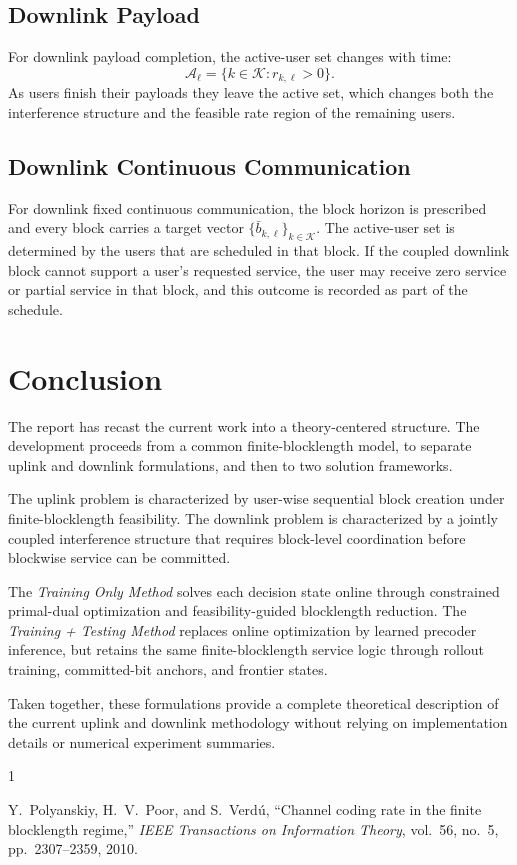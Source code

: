 \documentclass[11pt]{article}
\newcommand{\Kset}{\mathcal{K}}
\newcommand{\Aset}{\mathcal{A}}
\begin{document}
\subsection{Downlink Payload}

For downlink payload completion, the active-user set changes with time:
\begin{equation}
\Aset_\ell = \{k\in\Kset : r_{k,\ell}>0\}.
\label{eq:downlink-payload-active}
\end{equation}
As users finish their payloads they leave the active set, which changes both
the interference structure and the feasible rate region of the remaining users.

\subsection{Downlink Continuous Communication}

For downlink fixed continuous communication, the block horizon is prescribed and
every block carries a target vector $\{\bar b_{k,\ell}\}_{k\in\Kset}$. The
active-user set is determined by the users that are scheduled in that block. If
the coupled downlink block cannot support a user's requested service, the user
may receive zero service or partial service in that block, and this outcome is
recorded as part of the schedule.

\section{Conclusion}

The report has recast the current work into a theory-centered structure. The
development proceeds from a common finite-blocklength model, to separate uplink
and downlink formulations, and then to two solution frameworks.

The uplink problem is characterized by user-wise sequential block creation under
finite-blocklength feasibility. The downlink problem is characterized by a
jointly coupled interference structure that requires block-level coordination
before blockwise service can be committed.

The \emph{Training Only Method} solves each decision state online through
constrained primal-dual optimization and feasibility-guided blocklength
reduction. The \emph{Training + Testing Method} replaces online optimization by
learned precoder inference, but retains the same finite-blocklength service
logic through rollout training, committed-bit anchors, and frontier states.

Taken together, these formulations provide a complete theoretical description of
the current uplink and downlink methodology without relying on implementation
details or numerical experiment summaries.

\begin{thebibliography}{1}

Y.~Polyanskiy, H.~V.~Poor, and S.~Verd\'u,
``Channel coding rate in the finite blocklength regime,''
\emph{IEEE Transactions on Information Theory},
vol.~56, no.~5, pp.~2307--2359, 2010.

\end{thebibliography}
\end{document}
